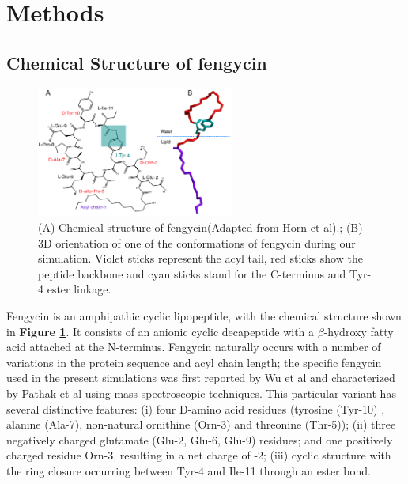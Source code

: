 \section{Methods}
\label{s:ch2_methods}

\subsection{Chemical Structure of fengycin} 
\label{ss:ch2_chem_str} 

\begin{figure}
\includegraphics[width=0.58\textwidth]{chapter2_figs/structure.pdf}
\caption{\label{fig:ch2_chemical_str} (A) Chemical
structure of fengycin(Adapted from Horn et al).\cite{Liu2007,HornGrossfield2013};
 (B) 3D orientation of one of the
conformations of fengycin during our simulation.
Violet sticks represent the acyl tail, red sticks
show the peptide backbone and cyan sticks stand for
the C-terminus and Tyr-4 ester linkage.}
\end{figure}

Fengycin is an
amphipathic cyclic lipopeptide, with the chemical structure shown in \textbf{Figure
\ref{fig:ch2_chemical_str}}. It consists of an anionic cyclic decapeptide with a
$\beta \mbox{-}$hydroxy fatty acid attached at the N-terminus.
\cite{HornGrossfield2013} Fengycin naturally occurs with a number of variations in the protein sequence and acyl
chain length; the specific fengycin used in the present simulations was first
reported by Wu et al and characterized by Pathak et al using mass spectroscopic
techniques.\cite{Liu2007,Balaram2012} This particular variant has several
distinctive features: (i) four D-amino acid residues
(tyrosine (Tyr-10) , alanine (Ala-7), non-natural ornithine (Orn-3) and threonine (Thr-5));
(ii) three negatively charged glutamate (Glu-2, Glu-6, Glu-9) residues; and one positively charged
residue Orn-3, resulting in a net charge of -2; (iii) cyclic structure with the
ring closure occurring between Tyr-4 and Ile-11 through an ester bond.



